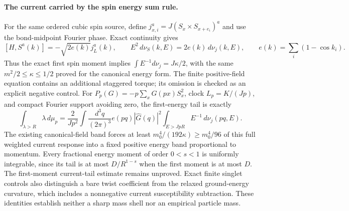\paragraph{The current carried by the spin energy sum rule.}
For the same ordered cubic spin source, define
$j_{x,i}^a=J(S_x\mathbin{\times}S_{x+e_i})^a$ and use the bond-midpoint
Fourier phase. Exact continuity gives
\[
 [H,S^a(k)]=-\sqrt{2e(k)}j_L^a(k),\qquad
 E^2\,d\nu_S(k,E)=2e(k)\,d\nu_j(k,E),
 \qquad e(k)=\sum_i(1-\cos k_i).
\]
Thus the exact first spin moment implies
$\int E^{-1}d\nu_j=J\kappa/2$, with the same
$m^2/2\leq\kappa\leq1/2$ proved for the canonical energy form.
The finite positive-field equation contains an additional staggered torque;
its omission is checked as an explicit negative control.
For $P_p(G)=-p\sum_xG(px)S_x^2$, clock $L_p=K/(Jp)$, and compact Fourier
support avoiding zero, the first-energy tail is exactly
\[
 \int_{\lambda>R}\lambda\,d\mu_p
 =\frac{2}{Jp^2}\int\frac{d^3q}{(2\pi)^3}
 e(pq)|\widehat G(q)|^2
 \int_{E>JpR}E^{-1}\,d\nu_j(pq,E).
\]
The existing canonical-field band forces at least
$m_0^4/(192\kappa)\geq m_0^4/96$ of this full weighted current response
into a fixed positive energy band proportional to momentum. Every
fractional energy moment of order $0<s<1$ is uniformly integrable, since
its tail is at most $D/R^{1-s}$ when the first moment is at most $D$.
The first-moment current-tail estimate remains unproved. Exact finite
singlet controls also distinguish a bare twist coefficient from the
relaxed ground-energy curvature, which includes a nonnegative current
susceptibility subtraction. These identities establish neither a sharp
mass shell nor an empirical particle mass.
